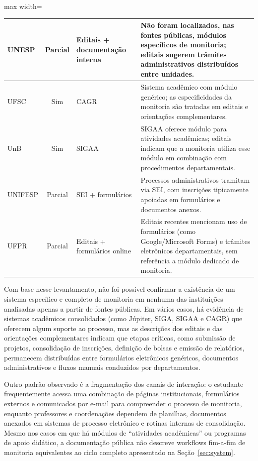 \documentclass[portuguese]{sbc2025}%
\begin{document}
\begin{table}[htb]
\begin{adjustbox}{max width=\textwidth}
\begin{tabular}{|l|c|p{3.5cm}|p{6cm}|}
      \hline
      UNESP   & Parcial & Editais + documentação interna       & Não foram localizados, nas fontes públicas, módulos específicos de monitoria; editais sugerem trâmites administrativos distribuídos entre unidades. \\
      \hline
      UFSC    & Sim    & CAGR                                 & Sistema acadêmico com módulo genérico; as especificidades da monitoria são tratadas em editais e orientações complementares. \\
      \hline
      UnB     & Sim    & SIGAA                                & SIGAA oferece módulo para atividades acadêmicas; editais indicam que a monitoria utiliza esse módulo em combinação com procedimentos departamentais. \\
      \hline
      UNIFESP & Parcial & SEI + formulários                    & Processos administrativos tramitam via SEI, com inscrições tipicamente apoiadas em formulários e documentos anexos. \\
      \hline
      UFPR    & Parcial & Editais + formulários online         & Editais recentes mencionam uso de formulários (como Google/Microsoft Forms) e trâmites eletrônicos departamentais, sem referência a módulo dedicado de monitoria. \\
      \hline
    \end{tabular}
  \end{adjustbox}
\end{table}

Com base nesse levantamento, não foi possível confirmar a existência de um sistema específico e completo de monitoria em nenhuma das instituições analisadas apenas a partir de fontes públicas. Em vários casos, há evidência de sistemas acadêmicos consolidados (como Júpiter, SIGA, SIGAA e CAGR) que oferecem algum suporte ao processo, mas as descrições dos editais e das orientações complementares indicam que etapas críticas, como submissão de projetos, consolidação de inscrições, definição de bolsas e emissão de relatórios, permanecem distribuídas entre formulários eletrônicos genéricos, documentos administrativos e fluxos manuais conduzidos por departamentos.

Outro padrão observado é a fragmentação dos canais de interação: o estudante frequentemente acessa uma combinação de páginas institucionais, formulários externos e comunicados por e-mail para compreender o processo de monitoria, enquanto professores e coordenações dependem de planilhas, documentos anexados em sistemas de processo eletrônico e rotinas internas de consolidação. Mesmo nos casos em que há módulos de ``atividades acadêmicas'' ou programas de apoio didático, a documentação pública não descreve workflows fim-a-fim de monitoria equivalentes ao ciclo completo apresentado na Seção~\ref{sec:system}.
\end{document}

